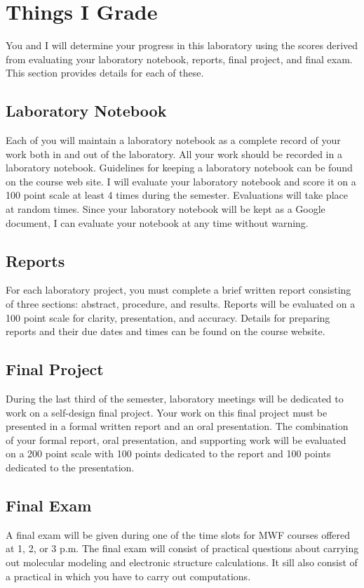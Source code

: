 \documentclass[letterpaper,oneside,onecolumn,11pt,article]{memoir}
\begin{document}
\section{Things I Grade}
You and I will determine your progress in this laboratory using the scores derived from evaluating your laboratory notebook, reports, final project, and final exam. This section provides details for each of these.

\subsection{Laboratory Notebook}
Each of you will maintain a laboratory notebook as a complete record of your work both in and out of the laboratory. All your work should be recorded in a laboratory notebook. Guidelines for keeping a laboratory notebook can be found on the course web site. I will evaluate your laboratory notebook and score it on a 100 point scale at least 4 times during the semester. Evaluations will take place at random times. Since your laboratory notebook will be kept as a Google document, I can evaluate your notebook at any time without warning.

\subsection{Reports}
For each laboratory project, you must complete a brief written report consisting of three sections: abstract, procedure, and results. Reports will be evaluated on a 100 point scale for clarity, presentation, and accuracy. Details for preparing reports and their due dates and times can be found on the course website.

\subsection{Final Project}
During the last third of the semester, laboratory meetings will be dedicated to work on a self-design final project. Your work on this final project must be presented in a formal written report and an oral presentation. The combination of your formal report, oral presentation, and supporting work will be evaluated on a 200 point scale with 100 points dedicated to the report and 100 points dedicated to the presentation. 

\subsection{Final Exam}
A final exam will be given during one of the time slots for MWF courses offered at 1, 2, or 3 p.m. The final exam will consist of practical questions about carrying out molecular modeling and electronic structure calculations. It sill also consist of a practical in which you have to carry out computations. 
\end{document}
